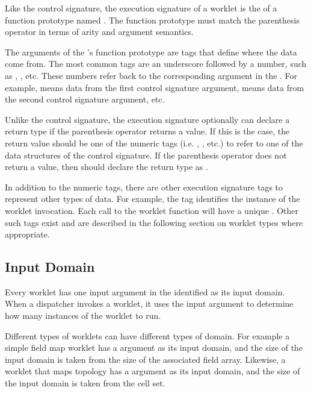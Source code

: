 Like the control signature, the execution signature of a worklet is the
 of a function prototype named \executionsignature. The
function prototype must match the parenthesis operator in terms of arity
and argument semantics.

The arguments of the \executionsignature's function prototype are tags that
define where the data come from. The most common tags are an underscore
followed by a number, such as , , etc. These
numbers refer back to the corresponding argument in the
\controlsignature. For example,  means data from the first
control signature argument,  means data from the second
control signature argument, etc.

Unlike the control signature, the execution signature optionally can
declare a return type if the parenthesis operator returns a value. If this
is the case, the return value should be one of the numeric tags
(i.e. , , etc.) to refer to one of the data
structures of the control signature. If the parenthesis operator does not
return a value, then \executionsignature should declare the return type as
.

In addition to the numeric tags, there are other execution signature tags
to represent other types of data. For example, the  tag
identifies the instance of the worklet invocation. Each call to the worklet
function will have a unique . Other such tags exist and
are described in the following section on worklet types where appropriate.


\subsection{Input Domain}
\label{sec:InputDomain}


Every worklet has one input argument in the \controlsignature identified as
its input domain. When a dispatcher invokes a worklet, it uses the input
argument to determine how many instances of the worklet to run.

Different types of worklets can have different types of domain. For example
a simple field map worklet has a  argument as its input
domain, and the size of the input domain is taken from the size of the
associated field array. Likewise, a worklet that maps topology has a
 argument as its input domain, and the size of the input
domain is taken from the cell set.


